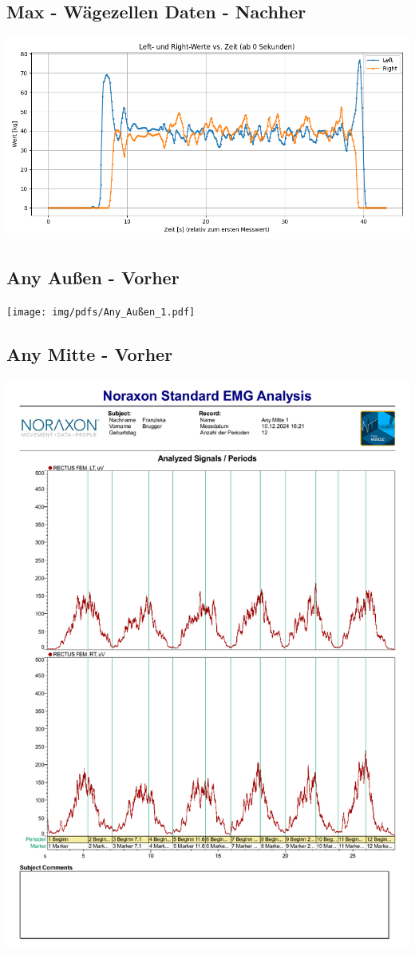 \subsection{Max - Wägezellen Daten - Nachher}
\includegraphics[width=.99\textwidth]{img/pyplots/Messdaten - Max.png}
\clearpage

\subsection*{Any Außen - Vorher}
\texttt{[image: img/pdfs/Any\_Außen\_1.pdf]}
\clearpage

\subsection*{Any Mitte - Vorher}
\includegraphics[width=.9\textwidth]{img/pdfs/Any_Mitte_1.pdf}
\clearpage

